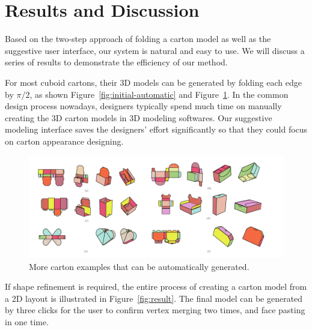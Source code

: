 \section{Results and Discussion}\label{sec:result}



Based on the two-step approach of folding a carton model as well as the suggestive user interface, our system is natural and easy to use. 
%
We will discuss a series of results to demonstrate the efficiency of our method. 


For most cuboid cartons, their 3D models can be generated by folding each edge by $\pi/2$, as shown Figure~\ref{fig:initial-automatic} and Figure~\ref{fig:automatic-more}.
In the common design process nowadays, designers typically spend much time on manually creating the 3D carton models in 3D modeling softwares. 
Our suggestive modeling interface saves the designers' effort significantly so that they could focus on carton appearance designing. 


\begin{figure}
	\centering
	\includegraphics[width=\textwidth]{images/moreAutomatic}
	\caption{More carton examples that can be automatically generated.}
	\label{fig:automatic-more}
	
\end{figure}


If shape refinement is required, the entire process of creating a carton model from a 2D layout is illustrated in Figure~\ref{fig:result}.
The final model can be generated by three clicks for the user to confirm vertex merging two times, and face pasting in one time. 

